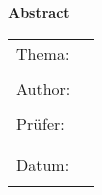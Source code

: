 \begin{center}
{\Large \textbf{Abstract}}
\end{center}

\bigskip

\begin{center}
	\begin{tabular}{p{2.8cm}p{10cm}}
		Thema: & \thema \\
		 & \\
		Author: & \autorAbs \\
		 & \\
		Prüfer: & \prueferA  \\[.5ex]
		 &  \prueferB \\
		 & \\
		Datum: & \abgabedatum \\
		 & \\
	\end{tabular}
\end{center}

\bigskip

\noindent
\zusammenfassung